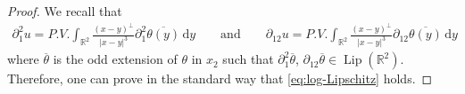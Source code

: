 \documentclass[10pt]{amsart}
\theoremstyle{definition}
\theoremstyle{remark}
\numberwithin{equation}{section}
\newcommand{\ud}{\mathrm{d}}
\newcommand{\rd}{\partial}
\newcommand{\0}{\emptyset}
\newcommand{\tht}{\theta}
\newcommand{\bbR}{\mathbb R}
\begin{document}
	\begin{proof}
		We recall that \begin{equation*}
			\begin{split}
				\partial_1^2 u = P.V. \int_{\bbR^2} \frac{(x-y)^{\perp}}{|x-y|^3} \partial_1^2 \overline{\tht(y)} \,\ud y \qquad\mbox{and}\qquad 				\partial_{12} u = P.V. \int_{\bbR^2} \frac{(x-y)^{\perp}}{|x-y|^3} \partial_{12} \overline{\tht(y)} \,\ud y 
			\end{split}
		\end{equation*}   where $\overline{\tht}$ is the odd extension of $\tht$ in $x_2$ such that $\partial_1^2 \overline{\tht}$, $\partial_{12} \overline{\tht} \in \operatorname{Lip}(\bbR^2)$. Therefore, one can prove in the standard way that \eqref{eq:log-Lipschitz} holds. 
	\end{proof}
	
\end{document}
